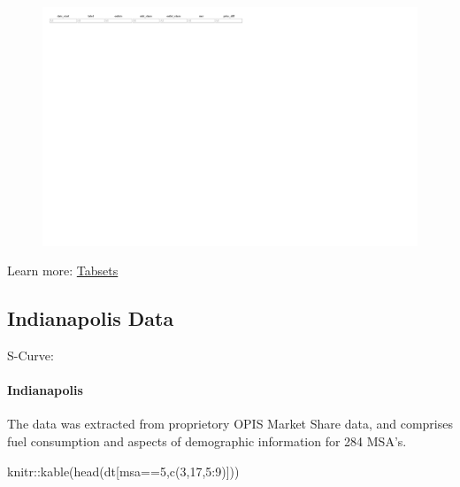 \documentclass[
  letterpaper,
  DIV=11,
  numbers=noendperiod]{scrartcl}
\let\oldparagraph\paragraph
\renewcommand{\paragraph}[1]{\oldparagraph{#1}\mbox{}}
\newenvironment{Shaded}{\begin{snugshade}}{\end{snugshade}}
\newcommand{\DecValTok}[1]{\textcolor[rgb]{0.68,0.00,0.00}{#1}}
\newcommand{\FunctionTok}[1]{\textcolor[rgb]{0.28,0.35,0.67}{#1}}
\newcommand{\NormalTok}[1]{\textcolor[rgb]{0.00,0.23,0.31}{#1}}
\newcommand{\SpecialCharTok}[1]{\textcolor[rgb]{0.37,0.37,0.37}{#1}}
\begin{document}
\begin{figure}[H]

{\centering \includegraphics{index-s-curve_files/figure-pdf/unnamed-chunk-2-1.pdf}

}

\end{figure}

Learn more:
\href{https://quarto.org/docs/presentations/revealjs/\#tabsets}{Tabsets}

\hypertarget{indianapolis-data}{%
\subsection{Indianapolis Data}\label{indianapolis-data}}

S-Curve:

\hypertarget{indianapolis}{%
\paragraph{Indianapolis}\label{indianapolis}}

The data was extracted from proprietory OPIS Market Share data, and
comprises fuel consumption and aspects of demographic information for
284 MSA's.

\begin{Shaded}
\begin{Highlighting}[]
\NormalTok{knitr}\SpecialCharTok{::}\FunctionTok{kable}\NormalTok{(}\FunctionTok{head}\NormalTok{(dt[msa}\SpecialCharTok{==}\DecValTok{5}\NormalTok{,}\FunctionTok{c}\NormalTok{(}\DecValTok{3}\NormalTok{,}\DecValTok{17}\NormalTok{,}\DecValTok{5}\SpecialCharTok{:}\DecValTok{9}\NormalTok{)]))}
\end{Highlighting}
\end{Shaded}
\end{document}
